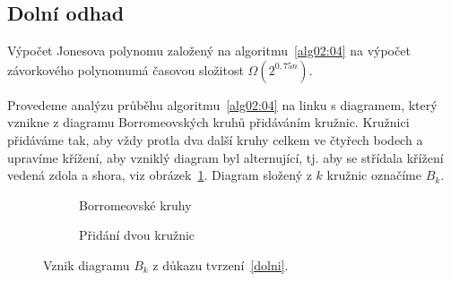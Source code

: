 \subsection{Dolní odhad}

\begin{tvrz} \label{dolni}
Výpočet Jonesova polynomu založený na algoritmu~\ref{alg02:04}  na výpočet závorkového polynomumá časovou složitost  $\Omega(2^{0,75 n})$.
\end{tvrz}

\begin{dukaz}
Provedeme analýzu průběhu algoritmu~\ref{alg02:04} na linku s diagramem, který vznikne z diagramu Borromeovských kruhů přidáváním kružnic. Kružnici přidáváme tak, aby vždy protla dva další kruhy celkem ve čtyřech bodech a upravíme křížení, aby vzniklý diagram byl alternující, tj. aby se střídala křížení vedená zdola a shora, viz obrázek~\ref{borro}. Diagram složený z $k$ kružnic označíme $B_k$.

\begin{figure}[h]  

\centering 
\begin{subfigure}[t]{0.4\linewidth}\centering
{} 
\caption{Borromeovské kruhy} 
\end{subfigure}
\begin{subfigure}[t]{0.4\linewidth}\centering
{}
\caption{Přidání dvou kružnic}
\end{subfigure}
\caption{Vznik diagramu $B_k$ z důkazu tvrzení~\ref{dolni}.} \label{borro}
\end{figure}  



\end{dukaz}
